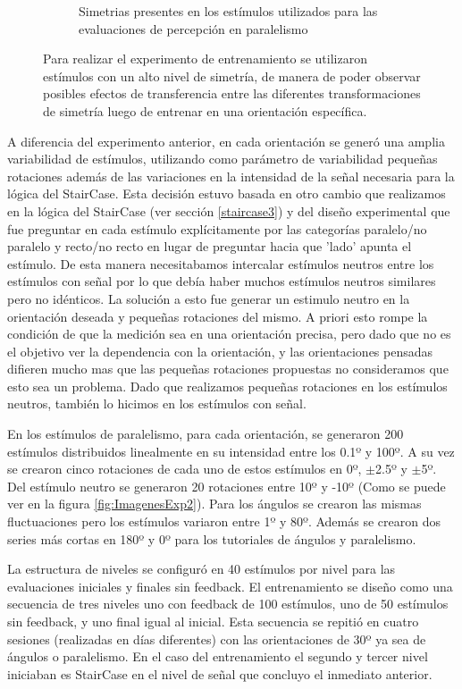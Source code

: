 \documentclass{article}
\begin{document}
\begin{figure}
\begin{subfigure}{.53\textwidth}
            \caption{Simetrias presentes en los estímulos utilizados para las evaluaciones de percepción en paralelismo}
        \end{subfigure}
        \caption{Para realizar el experimento de entrenamiento se utilizaron estímulos con un alto nivel de simetría, de manera de poder observar posibles efectos de transferencia entre las diferentes transformaciones de simetría luego de entrenar en una orientación específica.}
        \label{fig:simetrias}
    \end{figure}

    A diferencia del experimento anterior, en cada orientación se generó una amplia variabilidad de estímulos, utilizando como parámetro de variabilidad pequeñas rotaciones además de las variaciones en la intensidad de la señal necesaria para la lógica del StairCase. Esta decisión estuvo basada en otro cambio que realizamos en la lógica del StairCase (ver sección \ref{staircase3}) y del diseño experimental que fue preguntar en cada estímulo explícitamente por las categorías paralelo/no paralelo y recto/no recto en lugar de preguntar hacia que 'lado' apunta el estímulo. De esta manera necesitabamos intercalar estímulos neutros entre los estímulos con señal por lo que debía haber muchos estímulos neutros similares pero no idénticos. La solución a esto fue generar un estimulo neutro en la orientación deseada y pequeñas rotaciones del mismo. A priori esto rompe la condición de que la medición sea en una orientación precisa, pero dado que no es el objetivo ver la dependencia con la orientación, y las orientaciones pensadas difieren mucho mas que las pequeñas rotaciones propuestas no consideramos que esto sea un problema. Dado que realizamos pequeñas rotaciones en los estímulos neutros, también lo hicimos en los estímulos con señal.
    
    En los estímulos de paralelismo, para cada orientación, se generaron 200 estímulos distribuidos linealmente en su intensidad entre los 0.1º y 100º. A su vez se crearon cinco rotaciones de cada uno de estos estímulos en 0º, $\pm$2.5º y $\pm$5º. Del estímulo neutro se generaron 20 rotaciones entre 10º y -10º (Como se puede ver en la figura \ref{fig:ImagenesExp2}). Para los ángulos se crearon las mismas fluctuaciones pero los estímulos variaron entre 1º y 80º. Además se crearon dos series más cortas en 180º y 0º para los tutoriales de ángulos y paralelismo. 
    
    La estructura de niveles se configuró en 40 estímulos por nivel para las evaluaciones iniciales y finales sin feedback. El entrenamiento se diseño como una secuencia de tres niveles uno con feedback de 100 estímulos, uno de 50 estímulos sin feedback, y uno final igual al inicial. Esta secuencia se repitió en cuatro sesiones (realizadas en días diferentes) con las orientaciones de 30º ya sea de ángulos o paralelismo. En el caso del entrenamiento el segundo y tercer nivel iniciaban es StairCase en el nivel de señal que concluyo el inmediato anterior. 
    
\end{document}
